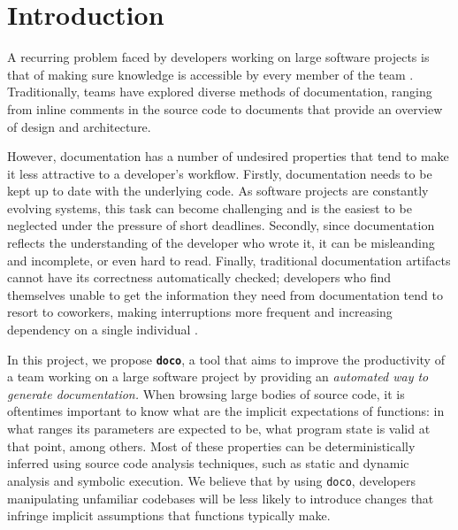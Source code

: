\section{Introduction}

A recurring problem faced by developers working on large software projects is
that of making sure knowledge is accessible by every member of the team \cite{Ko:2007}.
Traditionally, teams have explored diverse methods of documentation, ranging
from inline comments in the source code to documents that provide an overview
of design and architecture.

However, documentation has a number of undesired properties that tend to make
it less attractive to a developer's workflow. Firstly, documentation needs to
be kept up to date with the underlying code. As software projects are
constantly evolving systems, this task can become challenging and is the
easiest to be neglected under the pressure of short deadlines. Secondly, since
documentation reflects the understanding of the developer who wrote it, it can
be misleanding and incomplete, or even hard to read. Finally, traditional
documentation artifacts cannot have its correctness automatically checked;
developers who find themselves unable to get the information they need from
documentation tend to resort to coworkers, making interruptions more frequent
and increasing dependency on a single individual \cite{Ko:2007}.

In this project, we propose \textbf{\texttt{doco}}, a tool that aims to improve
the productivity of a team working on a large software project by providing an
\emph{automated way to generate documentation.} When browsing large bodies of
source code, it is oftentimes important to know what are the implicit
expectations of functions: in what ranges its parameters are expected to be,
what program state is valid at that point, among others.  Most of these
properties can be deterministically inferred using source code analysis
techniques, such as static and dynamic analysis and symbolic execution. We
believe that by using \texttt{doco}, developers manipulating unfamiliar
codebases will be less likely to introduce changes that infringe implicit
assumptions that functions typically make.
